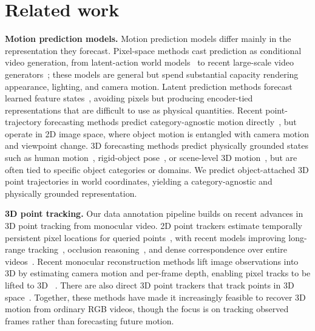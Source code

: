 \documentclass{llmxive}
\begin{document}
\section{Related work}
\label{sec:related_work}


\noindent\textbf{Motion prediction models.}
Motion prediction models differ mainly in the representation they forecast. Pixel-space methods cast prediction as conditional video generation, from latent-action world models~\cite{micheli2023iris, hu2023gaia1} to recent large-scale video generators~\cite{bruce2024genie, nvidia2025cosmos, wan22}; these models are general but spend substantial capacity rendering appearance, lighting, and camera motion. Latent prediction methods forecast learned feature states~\cite{zhou2025dinowm, assran2025vjepa2}, avoiding pixels but producing encoder-tied representations that are difficult to use as physical quantities. Recent point-trajectory forecasting methods predict category-agnostic motion directly~\cite{track2act, thakkar2026forecastingmotion}, but operate in 2D image space, where object motion is entangled with camera motion and viewpoint change. 3D forecasting methods predict physically grounded states such as human motion~\cite{mao2020learningtrajectorydependencieshuman}, rigid-object pose~\cite{Yoshida_2025_CVPR, soraki2026objectforesightpredictingfuture3d}, or scene-level 3D motion~\cite{pointworld}, but are often tied to specific object categories or domains. We predict object-attached 3D point trajectories in world coordinates, yielding a category-agnostic and physically grounded representation.


\noindent\textbf{3D point tracking.}
Our data annotation pipeline builds on recent advances in 3D point tracking from monocular video. 2D point trackers estimate temporally persistent pixel locations for queried points~\cite{doersch2022tapvid, doersch2023tapir}, with recent models improving long-range tracking~\cite{doersch2024bootstap}, occlusion reasoning~\cite{cotracker3}, and dense correspondence over entire videos~\cite{alltracker}. 
Recent monocular reconstruction methods lift image observations into 3D by estimating camera motion and per-frame depth, enabling pixel tracks to be lifted to 3D ~\cite{vipe, megasam}. 
There are also direct 3D point trackers that track points in 3D space~\cite{spatialtrackerv2, feng2025st4rtrack, zhang2025efficientlyreconstructingdynamicscenes}. 
Together, these methods have made it increasingly feasible to recover 3D motion from ordinary RGB videos, though the focus is on tracking observed frames rather than forecasting future motion.
\end{document}

